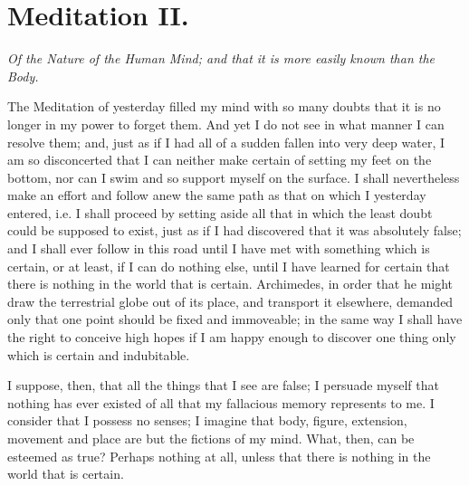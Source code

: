 \section*{Meditation II.}

\begin{center}\textit{Of the Nature of the Human Mind; and that it is
more easily known than the Body.}\end{center}

The Meditation of yesterday filled my mind with so many doubts that it
is no longer in my power to forget them. And yet I do not see in what
manner I can resolve them; and, just as if I had all of a sudden
fallen into very deep water, I am so disconcerted that I can neither
make certain of setting my feet on the bottom, nor can I swim and so
support myself on the surface. I shall nevertheless make an effort and
follow anew the same path as that on which I yesterday entered, i.e. I
shall proceed by setting aside all that in which the least doubt could
be supposed to exist, just as if I had discovered that it was
absolutely false; and I shall ever follow in this road until I have
met with something which is certain, or at least, if I can do nothing
else, until I have learned for certain that there is nothing in the
world that is certain. Archimedes, in order that he might draw the
terrestrial globe out of its place, and transport it elsewhere,
demanded only that one point should be fixed and immoveable; in the
same way I shall have the right to conceive high hopes if I am happy
enough to discover one thing only which is certain and indubitable.

I suppose, then, that all the things that I see are false; I persuade
myself that nothing has ever existed of all that my fallacious memory
represents to me. I consider that I possess no senses; I imagine that
body, figure, extension, movement and place are but the fictions of my
mind. What, then, can be esteemed as true? Perhaps nothing at all,
unless that there is nothing in the world that is certain.

